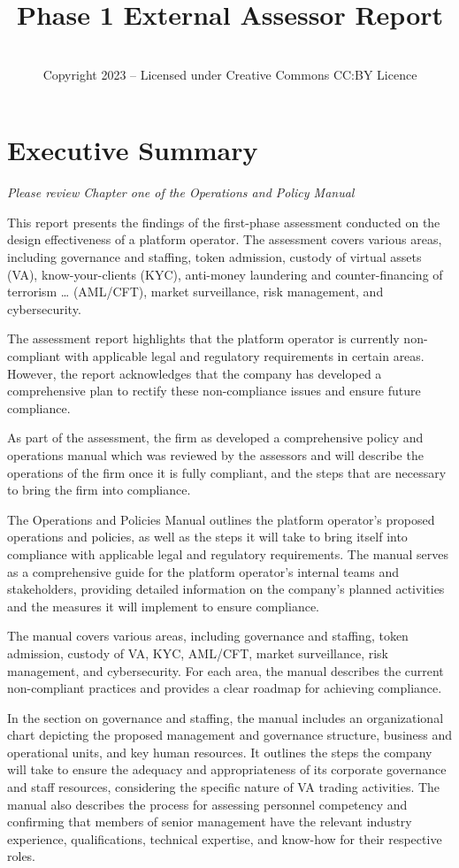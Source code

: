 \documentclass[]{report}
\title{Phase 1 External Assessor Report}
\author{\firmfullname\\Copyright 2023 – Licensed under Creative
  Commons CC:BY Licence}
\begin{document}
\maketitle

\chapter{Executive Summary}
\textit{Please review Chapter one of the Operations and Policy Manual}

This report presents the findings of the first-phase assessment
conducted on the design effectiveness of a platform operator. The
assessment covers various areas, including governance and staffing,
token admission, custody of virtual assets (VA), know-your-clients
(KYC), anti-money laundering and counter-financing of terrorism
… (AML/CFT), market surveillance, risk management, and
cybersecurity.

The assessment report highlights that the platform operator is
currently non-compliant with applicable legal and regulatory
requirements in certain areas. However, the report acknowledges that
the company has developed a comprehensive plan to rectify these
non-compliance issues and ensure future compliance.

As part of the assessment, the firm as developed a comprehensive
policy and operations manual which was reviewed by the assessors and
will describe the operations of the firm once it is fully compliant,
and the steps that are necessary to bring the firm into compliance.

The Operations and Policies Manual outlines the platform operator's
proposed operations and policies, as well as the steps it will take to
bring itself into compliance with applicable legal and regulatory
requirements. The manual serves as a comprehensive guide for the
platform operator's internal teams and stakeholders, providing
detailed information on the company's planned activities and the
measures it will implement to ensure compliance.

The manual covers various areas, including governance and staffing,
token admission, custody of VA, KYC, AML/CFT, market surveillance,
risk management, and cybersecurity. For each area, the manual
describes the current non-compliant practices and provides a clear
roadmap for achieving compliance.

In the section on governance and staffing, the manual includes an
organizational chart depicting the proposed management and governance
structure, business and operational units, and key human resources. It
outlines the steps the company will take to ensure the adequacy and
appropriateness of its corporate governance and staff resources,
considering the specific nature of VA trading activities. The
manual also describes the process for assessing personnel competency
and confirming that members of senior management have the relevant
industry experience, qualifications, technical expertise, and know-how
for their respective roles.
\end{document}
